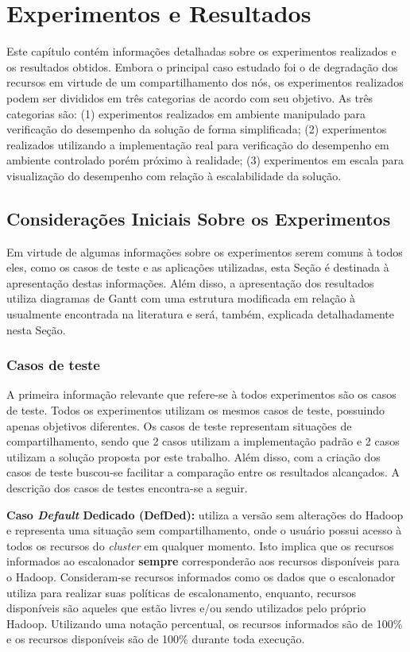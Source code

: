 \chapter{Experimentos e Resultados}
\label{chap:ExpRes}
Este capítulo contém informações detalhadas sobre os experimentos realizados e os resultados obtidos. Embora o principal caso estudado foi o de degradação dos recursos em virtude de um compartilhamento dos nós, os experimentos realizados podem ser divididos em três categorias de acordo com seu objetivo. As três categorias são: (1) experimentos realizados em ambiente manipulado para verificação do desempenho da solução de forma simplificada; (2) experimentos realizados utilizando a implementação real para verificação do desempenho em ambiente controlado porém próximo à realidade; (3) experimentos em escala para visualização do desempenho com relação à escalabilidade da solução.

\section{Considerações Iniciais Sobre os Experimentos}
\label{sec:casosteste}
Em virtude de algumas informações sobre os experimentos serem comuns à todos eles, como os casos de teste e as aplicações utilizadas, esta Seção é destinada à apresentação destas informações. Além disso, a apresentação dos resultados utiliza diagramas de Gantt com uma estrutura modificada em relação à usualmente encontrada na literatura e será, também, explicada detalhadamente nesta Seção.

\subsection{Casos de teste}
A primeira informação relevante que refere-se à todos experimentos são os casos de teste. Todos os experimentos utilizam os mesmos casos de teste, possuindo apenas objetivos diferentes. Os casos de teste representam situações de compartilhamento, sendo que 2 casos utilizam a implementação padrão e 2 casos utilizam a solução proposta por este trabalho. Além disso, com a criação dos casos de teste buscou-se facilitar a comparação entre os resultados alcançados. A descrição dos casos de testes encontra-se a seguir.

\textbf{Caso \textit{Default} Dedicado (DefDed):} utiliza a versão sem alterações do Hadoop e representa uma situação sem compartilhamento, onde o usuário possui acesso à todos os recursos do \textit{cluster} em qualquer momento. Isto implica que os recursos informados ao escalonador \textbf{sempre} corresponderão aos recursos disponíveis para o Hadoop. Consideram-se recursos informados como os dados que o escalonador utiliza para realizar suas políticas de escalonamento, enquanto, recursos disponíveis são aqueles que estão livres e/ou sendo utilizados pelo próprio Hadoop. Utilizando uma notação percentual, os recursos informados são de 100\% e os recursos disponíveis são de 100\% durante toda execução.

